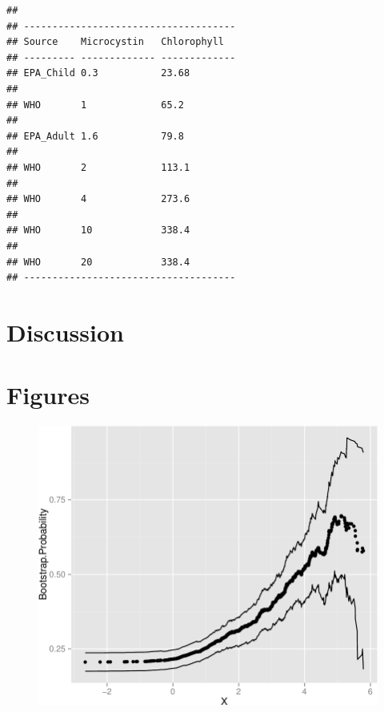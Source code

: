 \documentclass[11pt,]{article}
\begin{document}
\begin{verbatim}
## 
## -------------------------------------
## Source    Microcystin   Chlorophyll  
## --------- ------------- -------------
## EPA_Child 0.3           23.68        
## 
## WHO       1             65.2         
## 
## EPA_Adult 1.6           79.8         
## 
## WHO       2             113.1        
## 
## WHO       4             273.6        
## 
## WHO       10            338.4        
## 
## WHO       20            338.4        
## -------------------------------------
\end{verbatim}

\section{Discussion}\label{discussion}

\section{Figures}\label{figures}

\begin{figure}[htbp]
\centering
\includegraphics{manuscript_files/figure-latex/epa_child_cp_plot-1.pdf}
\caption{}
\end{figure}

\newpage
\end{document}
